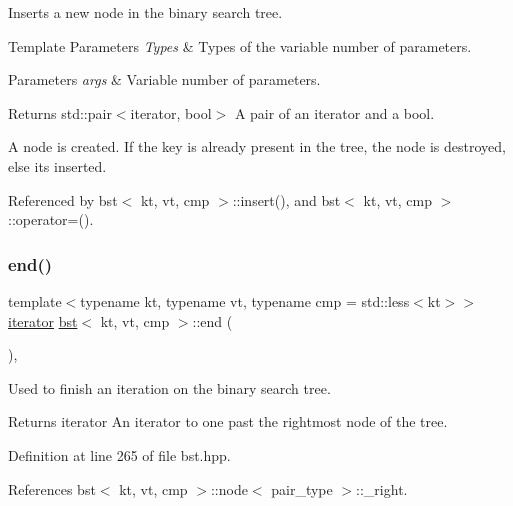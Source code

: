 Inserts a new node in the binary search tree. 


\begin{DoxyTemplParams}{Template Parameters}
{\em Types} & Types of the variable number of parameters. \\
\hline
\end{DoxyTemplParams}

\begin{DoxyParams}{Parameters}
{\em args} & Variable number of parameters. \\
\hline
\end{DoxyParams}
\begin{DoxyReturn}{Returns}
std\+::pair$<$iterator, bool$>$ A pair of an iterator and a bool.
\end{DoxyReturn}
A node is created. If the key is already present in the tree, the node is destroyed, else it\textquotesingle{}s inserted. 

Referenced by bst$<$ kt, vt, cmp $>$\+::insert(), and bst$<$ kt, vt, cmp $>$\+::operator=().

\mbox{\label{classbst_aed3a831efc810b5084cb0c9f4adeb16a}} 
\subsubsection{\texorpdfstring{end()}{end()}\hspace{0.1cm}{\footnotesize\ttfamily [1/2]}}
{\footnotesize\ttfamily template$<$typename kt, typename vt, typename cmp = std\+::less$<$kt$>$$>$ \\
\hyperlink{classbst_a429b0445783ff6486882db5dee900ce0}{iterator} \hyperlink{classbst}{bst}$<$ kt, vt, cmp $>$\+::end (\begin{DoxyParamCaption}{ }\end{DoxyParamCaption})\hspace{0.3cm}{\ttfamily [inline]}, {\ttfamily [noexcept]}}



Used to finish an iteration on the binary search tree. 

\begin{DoxyReturn}{Returns}
iterator An iterator to one past the rightmost node of the tree. 
\end{DoxyReturn}


Definition at line 265 of file bst.\+hpp.



References bst$<$ kt, vt, cmp $>$\+::node$<$ pair\+\_\+type $>$\+::\+\_\+right.

